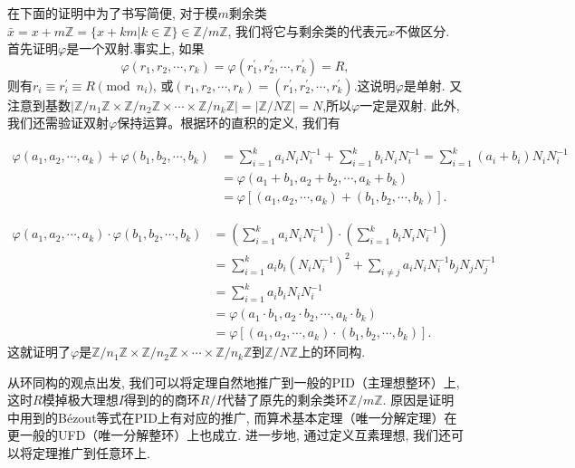 \documentclass[color=green,mathpazo,titlestyle=hang]{elegantbook}
\begin{document}
  \begin{newproof}
	在下面的证明中为了书写简便, 对于模$m$剩余类$\bar{x}=x+m\mathbb{Z}=\{x+km|k\in\mathbb{Z}\}\in \mathbb{Z}/m\mathbb{Z}$, 我们将它与剩余类的代表元$x$不做区分. 首先证明$\varphi$是一个双射.事实上, 如果
	\[
	\varphi(r_1,r_2,\cdots,r_k)=\varphi(r_1^{'},r_2^{'},\cdots,r_k^{'})=R,
	\]
	则有$r_i\equiv r_i^{'}\equiv R \pmod{n_i} $, 或$(r_1,r_2,\cdots,r_k)=(r_1^{'},r_2^{'},\cdots,r_k^{'}).$这说明$\varphi$是单射.
	又注意到基数$\left|\mathbb{Z}/n_1\mathbb{Z}\times\mathbb{Z}/n_2\mathbb{Z}\times\cdots\times\mathbb{Z}/n_k\mathbb{Z}\right|=\left|\mathbb{Z}/N\mathbb{Z}\right|=N$,所以$\varphi$一定是双射.
	此外, 我们还需验证双射$\varphi$保持运算。根据环的直积的定义, 我们有
	
	\begin{equation*}	
	\begin{aligned}
	\varphi(a_1,a_2,\cdots,a_k)+\varphi(b_1,b_2,\cdots,b_k)	
	&=\sum_{i=1}^{k}a_iN_i N_i^{-1}+\sum_{i=1}^{k}b_iN_i N_i^{-1}=\sum_{i=1}^{k}(a_i+b_i)N_i N_i^{-1}\\
	&=\varphi(a_1+b_1,a_2+b_2,\cdots,a_k+b_k)\\
	&=\varphi[(a_1,a_2,\cdots,a_k)+(b_1,b_2,\cdots,b_k)].
	\end{aligned}		
	\end{equation*}
	
	\begin{equation*}	
	\begin{aligned}
	\varphi(a_1,a_2,\cdots,a_k)\cdot\varphi(b_1,b_2,\cdots,b_k)	
	&=\left(\sum_{i=1}^{k}a_iN_i N_i^{-1}\right)\cdot\left(\sum_{i=1}^{k}b_iN_i N_i^{-1}\right)\\
	&=\sum_{i=1}^{k}a_i b_i (N_i N_i^{-1})^2+\sum_{i\ne j}a_iN_i N_i^{-1}b_jN_j N_j^{-1}\\
	&=\sum_{i=1}^{k}a_i b_i N_i N_i^{-1}\\
	&=\varphi(a_1\cdot b_1,a_2\cdot b_2,\cdots,a_k\cdot b_k)\\
	&=\varphi[(a_1,a_2,\cdots,a_k)\cdot(b_1,b_2,\cdots,b_k)].
	\end{aligned}		
	\end{equation*}  
    这就证明了$\varphi$是$\mathbb{Z}/n_1\mathbb{Z}\times\mathbb{Z}/n_2\mathbb{Z}\times\cdots\times\mathbb{Z}/n_k\mathbb{Z}$到$\mathbb{Z}/N\mathbb{Z}$上的环同构.

  \end{newproof}

  从环同构的观点出发, 我们可以将定理自然地推广到一般的PID（主理想整环）上, 这时$R$模掉极大理想$I$得到的的商环$R/I$代替了原先的剩余类环$\mathbb{Z}/m\mathbb{Z}$. 原因是证明中用到的B\'{e}zout等式在PID上有对应的推广, 而算术基本定理（唯一分解定理）在更一般的UFD（唯一分解整环）上也成立. 进一步地, 通过定义互素理想, 我们还可以将定理推广到任意环上.
\end{document}
